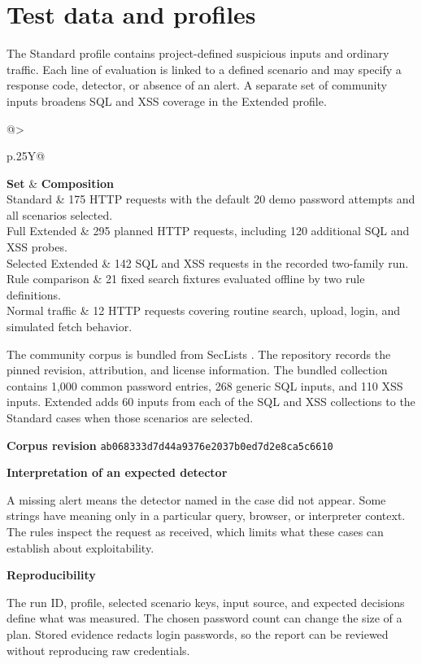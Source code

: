 \documentclass[11pt,a4paper,oneside]{report}
\makeatletter
\newcommand{\topic}[1]{\par\addvspace{4pt}\noindent\textbf{#1}\par\nobreak\vspace{-.20em}}
\newcommand{\sheet}[1]{\clearpage\section{#1}}
\newcommand{\tabletitle}[1]{\par\addvspace{6pt}\noindent\parbox{\linewidth}{\captionof{table}{#1}}\par\nobreak}
\newcommand{\bodytable}[1]{\begin{tabularx}{\linewidth}{@{}>{\raggedright\arraybackslash}p{.25\linewidth}Y@{}}\toprule #1\bottomrule\end{tabularx}}
\makeatother
\begin{document}
\sheet{Test data and profiles}
The Standard profile contains project-defined suspicious inputs and ordinary traffic. Each line of evaluation is linked to a defined scenario and may specify a response code, detector, or absence of an alert. A separate set of community inputs broadens SQL and XSS coverage in the Extended profile.

\tabletitle{Test sets and their composition}
\bodytable{\textbf{Set} & \textbf{Composition}\\\midrule
Standard & 175 HTTP requests with the default 20 demo password attempts and all scenarios selected.\\
Full Extended & 295 planned HTTP requests, including 120 additional SQL and XSS probes.\\
Selected Extended & 142 SQL and XSS requests in the recorded two-family run.\\
Rule comparison & 21 fixed search fixtures evaluated offline by two rule definitions.\\
Normal traffic & 12 HTTP requests covering routine search, upload, login, and simulated fetch behavior.\\}

The community corpus is bundled from SecLists \cite{seclists}. The repository records the pinned revision, attribution, and license information. The bundled collection contains 1,000 common password entries, 268 generic SQL inputs, and 110 XSS inputs. Extended adds 60 inputs from each of the SQL and XSS collections to the Standard cases when those scenarios are selected.

\textbf{Corpus revision} \texttt{ab068333d7d44a9376e2037b0ed7d2e8ca5c6610}

\topic{Interpretation of an expected detector}
A missing alert means the detector named in the case did not appear. Some strings have meaning only in a particular query, browser, or interpreter context. The rules inspect the request as received, which limits what these cases can establish about exploitability.

\topic{Reproducibility}
The run ID, profile, selected scenario keys, input source, and expected decisions define what was measured. The chosen password count can change the size of a plan. Stored evidence redacts login passwords, so the report can be reviewed without reproducing raw credentials.

\end{document}

